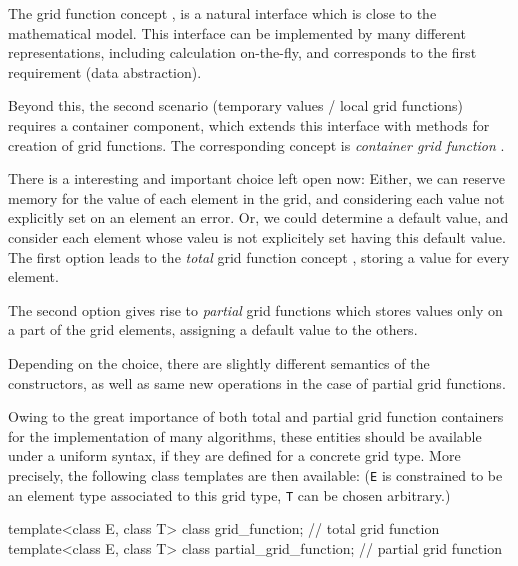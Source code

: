       The grid function concept ,
      is a natural interface
      which is close to the  mathematical model.
      This interface can be implemented by many different representations,
      including calculation on-the-fly, and corresponds to the first
      requirement (data abstraction).
      
      Beyond this, the second scenario (temporary values / local grid functions)
      requires a  container component,
      which extends this interface with
      methods for creation of grid functions. 
      The corresponding concept 
      is {\em container grid function\/}  .

      There is a interesting and important choice left open now:
      Either, we can reserve memory for the value of each element in the grid,
      and considering each value not explicitly set on an element an error.
      Or, we could determine a default value, and consider each element whose
      valeu is not explicitely set having this default value.
      The first option leads to the {\em total\/} grid function concept
      ,
      storing a value for every element.
      
      The second option gives rise to  {\em partial\/}
      grid functions     
      which stores values  only on a part of the grid elements,
      assigning a default value to the others.
      
      Depending on the choice, there are slightly different semantics of the constructors,
      as well as same new operations in the case of  partial grid functions.
      
      Owing to the great importance of both total and partial grid function containers
      for the implementation of many algorithms, these entities should be 
      available under a uniform syntax, if they are defined for a concrete grid type.
      More precisely, the following class templates are then available: 
     {\small ({\tt E} is constrained to be an element type  
      associated to this grid type, {\tt T} can be chosen arbitrary.)}
     
\begin{example}
template<class E, class T> 
class grid\_function; // total grid function 
template<class E, class T>
class partial\_grid\_function; // partial grid function
\end{example}

